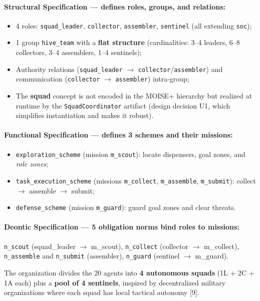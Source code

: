 \documentclass[11pt,a4paper]{article}
\newcommand{\code}[1]{\texttt{#1}}
\begin{document}
\paragraph{Structural Specification --- defines roles, groups, and relations:}
\begin{itemize}
  \item 4 roles: \code{squad\_leader}, \code{collector}, \code{assembler}, \code{sentinel} (all extending \code{soc});
  \item 1 group \code{hive\_team} with a \textbf{flat structure} (cardinalities: 3--4 leaders, 6--8 collectors, 3--4 assemblers, 1--4 sentinels);
  \item Authority relations (\code{squad\_leader} $\rightarrow$ \code{collector}/\code{assembler}) and communication (\code{collector} $\rightarrow$ \code{assembler}) intra-group;
  \item The \textbf{squad} concept is not encoded in the MOISE+ hierarchy but realized at runtime by the \code{SquadCoordinator} artifact (design decision U1, which simplifies instantiation and makes it robust).
\end{itemize}

\paragraph{Functional Specification --- defines 3 schemes and their missions:}
\begin{itemize}
  \item \code{exploration\_scheme} (mission \code{m\_scout}): locate dispensers, goal zones, and \emph{role zones};
  \item \code{task\_execution\_scheme} (missions \code{m\_collect}, \code{m\_assemble}, \code{m\_submit}): collect $\rightarrow$ assemble $\rightarrow$ submit;
  \item \code{defense\_scheme} (mission \code{m\_guard}): guard goal zones and clear threats.
\end{itemize}

\paragraph{Deontic Specification --- 5 obligation norms bind roles to missions:}
\code{n\_scout} (squad\_leader $\rightarrow$ m\_scout), \code{n\_collect} (collector $\rightarrow$ m\_collect), \code{n\_assemble} and \code{n\_submit} (assembler), \code{n\_guard} (sentinel $\rightarrow$ m\_guard).

\medskip
The organization divides the 20 agents into \textbf{4 autonomous squads} (1L + 2C + 1A each) plus a \textbf{pool of 4 sentinels}, inspired by decentralized military organizations where each squad has local tactical autonomy [9].
\end{document}
